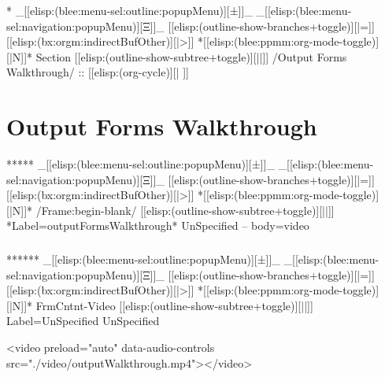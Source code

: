 \begin{whenOrg}
\begin{whenOrg}
*  _[[elisp:(blee:menu-sel:outline:popupMenu)][±]]_ _[[elisp:(blee:menu-sel:navigation:popupMenu)][Ξ]]_ [[elisp:(outline-show-branches+toggle)][|=]] [[elisp:(bx:orgm:indirectBufOther)][|>]] *[[elisp:(blee:ppmm:org-mode-toggle)][|N]]*  Section    [[elisp:(outline-show-subtree+toggle)][||]]   /Output Forms Walkthrough/ ::  [[elisp:(org-cycle)][| ]]
\end{whenOrg}

\section{Output Forms Walkthrough}

\begin{whenOrg}
*****  _[[elisp:(blee:menu-sel:outline:popupMenu)][±]]_ _[[elisp:(blee:menu-sel:navigation:popupMenu)][Ξ]]_ [[elisp:(outline-show-branches+toggle)][|=]] [[elisp:(bx:orgm:indirectBufOther)][|>]] *[[elisp:(blee:ppmm:org-mode-toggle)][|N]]*  /Frame:begin-blank/ [[elisp:(outline-show-subtree+toggle)][||]] *Label=outputFormsWalkthrough* UnSpecified -- body=video
\end{whenOrg}

\begin{frame}[fragile,plain,label=outputFormsWalkthrough]
    \frametitle{}

\begin{whenOrg}
******  _[[elisp:(blee:menu-sel:outline:popupMenu)][±]]_ _[[elisp:(blee:menu-sel:navigation:popupMenu)][Ξ]]_ [[elisp:(outline-show-branches+toggle)][|=]] [[elisp:(bx:orgm:indirectBufOther)][|>]] *[[elisp:(blee:ppmm:org-mode-toggle)][|N]]*  FrmCntnt-Video [[elisp:(outline-show-subtree+toggle)][||]] Label=UnSpecified UnSpecified
\end{whenOrg}
\begin{presentationMode}
\begin{htmlonly}
  \begin{rawhtml}
<video preload="auto" data-audio-controls src="./video/outputWalkthrough.mp4"></video>
  \end{rawhtml}
\end{htmlonly}
\end{presentationMode}


\end{frame}
\end{whenOrg}
